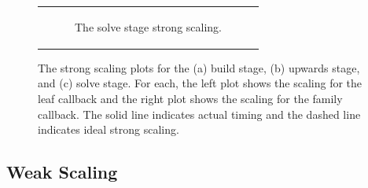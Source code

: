 \begin{figure}
\begin{tabular}{c}
\begin{subfigure}[t]{0.95\textwidth}
            \caption{The solve stage strong scaling.}
            \label{subfig:strong_solve}
        \end{subfigure}
        \\
    \end{tabular}
    \caption{The strong scaling plots for the (a) build stage, (b) upwards stage, and (c) solve stage. For each, the left plot shows the scaling for the leaf callback and the right plot shows the scaling for the family callback. The solid line indicates actual timing and the dashed line indicates ideal strong scaling.}
    \label{fig:strong_scaling_plots}
\end{figure}




\subsection{Weak Scaling}
\label{sub:weak-scaling}

